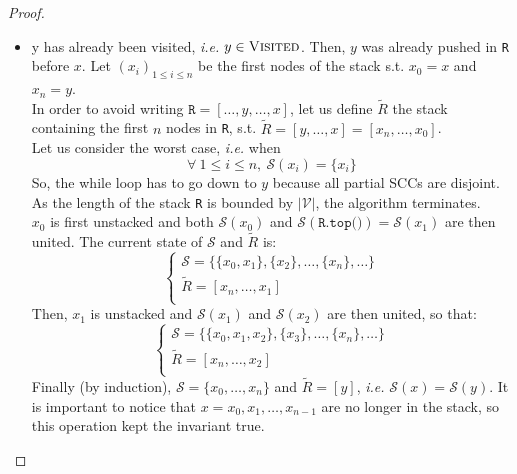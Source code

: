 \documentclass[a4 paper, 12pt]{article}
\begin{document}
\begin{proof}
\begin{itemize}
        \item y has already been visited, \textit{i.e.} $y \in \textsc{Visited}$. Then, $y$ was already pushed in \texttt{R} before $x$. Let $(x_i)_{1\leq i \leq n}$ be the first nodes of the stack s.t. $x_0 = x$ and $x_n = y$.\\
        In order to avoid writing $\texttt{R} = [\ldots, y, \ldots, x]$, let us define $\widetilde{R}$ the stack containing the first $n$ nodes in \texttt{R}, s.t. $\widetilde{R} = [y, \ldots, x] = [x_n, \ldots, x_0]$.\\
        Let us consider the worst case, \textit{i.e.} when
        \begin{equation*}
            \forall~1 \leq i \leq n,~\mathcal{S}(x_i) = \{x_i\}
        \end{equation*}
        So, the while loop has to go down to $y$ because all partial SCCs are disjoint. As the length of the stack \texttt{R} is bounded by $|\mathcal{V}|$, the algorithm terminates.\\
        $x_0$ is first unstacked and both $\mathcal{S}(x_0)$ and $\mathcal{S}(\texttt{R.top()}) = \mathcal{S}(x_1)$ are then united. The current state of $\mathcal{S}$ and $\widetilde{R}$ is:
        \begin{equation*}
            \left\{
                \begin{array}{l}
                    \mathcal{S} = \{\{x_0, x_1\}, \{x_2\}, \ldots, \{x_n\}, \ldots\}\\
                    \widetilde{R} = [x_n, \ldots, x_1]\\
                \end{array}
            \right.
        \end{equation*}
        Then, $x_1$ is unstacked and $\mathcal{S}(x_1)$ and $\mathcal{S}(x_2)$ are then united, so that:
        \begin{equation*}
            \left\{
                    \begin{array}{l}
                        \mathcal{S} = \{\{x_0, x_1, x_2\}, \{x_3\}, \ldots, \{x_n\}, \ldots\}\\
                        \widetilde{R} = [x_n, \ldots, x_2]\\
                    \end{array}
                \right.
        \end{equation*}
        Finally (by induction), $\mathcal{S} = \{x_0, \ldots, x_n\}$ and $\widetilde{R} = [y]$, \textit{i.e.} $\mathcal{S}(x)=\mathcal{S}(y)$. It is important to notice that $x=x_0, x_1, \ldots, x_{n-1}$ are no longer in the stack, so this operation kept the invariant true.
    \end{itemize}
\end{proof}
\end{document}
